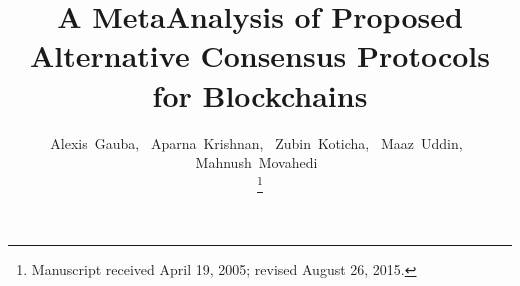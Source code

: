 \documentclass[10pt,journal,compsoc]{IEEEtran}
\begin{document}
%
\title{A MetaAnalysis of Proposed Alternative Consensus Protocols for Blockchains}
%
%
%
%

\author{Alexis~Gauba,~\IEEEmembership{}
        Aparna~Krishnan,~\IEEEmembership{}
        Zubin~Koticha,~\IEEEmembership{}
        Maaz~Uddin,~\IEEEmembership{}
        Mahnush~Movahedi~\IEEEmembership{}%
\IEEEcompsocitemizethanks{\protect\\
}%

\thanks{Manuscript received April 19, 2005; revised August 26, 2015.}}
\end{document}
